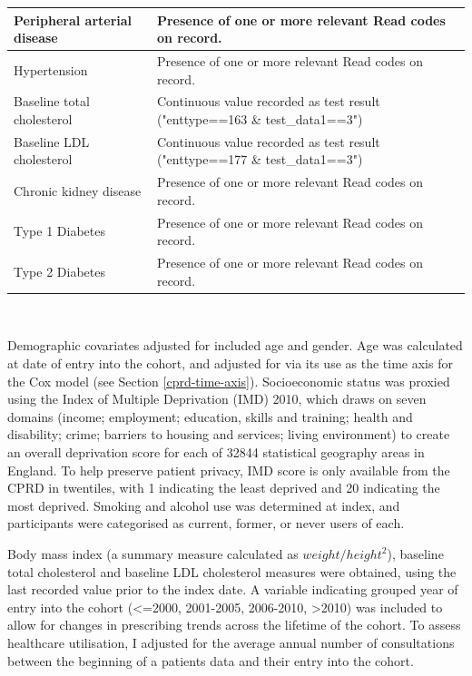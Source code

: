 \documentclass[a4paper, twoside]{templates/ociamthesis}
\begin{document}
\begin{table}[H]
\begin{tabular}[t]{>{\raggedright\arraybackslash}p{15em}>{\centering\arraybackslash}p{25em}}
\midrule
Peripheral arterial disease & Presence of one or more relevant Read codes on record.\\
\midrule
\addlinespace
Hypertension & Presence of one or more relevant Read codes on record.\\
\midrule
Baseline total cholesterol & Continuous value recorded as test result ("enttype==163 \& test\_data1==3")\\
\midrule
Baseline LDL cholesterol & Continuous value recorded as test result ("enttype==177 \& test\_data1==3")\\
\midrule
Chronic kidney disease & Presence of one or more relevant Read codes on record.\\
\midrule
Type 1 Diabetes & Presence of one or more relevant Read codes on record.\\
\midrule
\addlinespace
Type 2 Diabetes & Presence of one or more relevant Read codes on record.\\
\bottomrule
\end{tabular}
\end{table}

~

Demographic covariates adjusted for included age and gender. Age was calculated at date of entry into the cohort, and adjusted for via its use as the time axis for the Cox model (see Section \ref{cprd-time-axis}). Socioeconomic status was proxied using the Index of Multiple Deprivation (IMD) 2010, which draws on seven domains (income; employment; education, skills and training; health and disability; crime; barriers to housing and services; living environment) to create an overall deprivation score for each of 32844 statistical geography areas in England. To help preserve patient privacy, IMD score is only available from the CPRD in twentiles, with 1 indicating the least deprived and 20 indicating the most deprived. Smoking and alcohol use was determined at index, and participants were categorised as current, former, or never users of each.

Body mass index (a summary measure calculated as \(weight/height^2\)), baseline total cholesterol and baseline LDL cholesterol measures were obtained, using the last recorded value prior to the index date. A variable indicating grouped year of entry into the cohort (\textless=2000, 2001-2005, 2006-2010, \textgreater2010) was included to allow for changes in prescribing trends across the lifetime of the cohort. To assess healthcare utilisation, I adjusted for the average annual number of consultations between the beginning of a patients data and their entry into the cohort.
\end{document}
